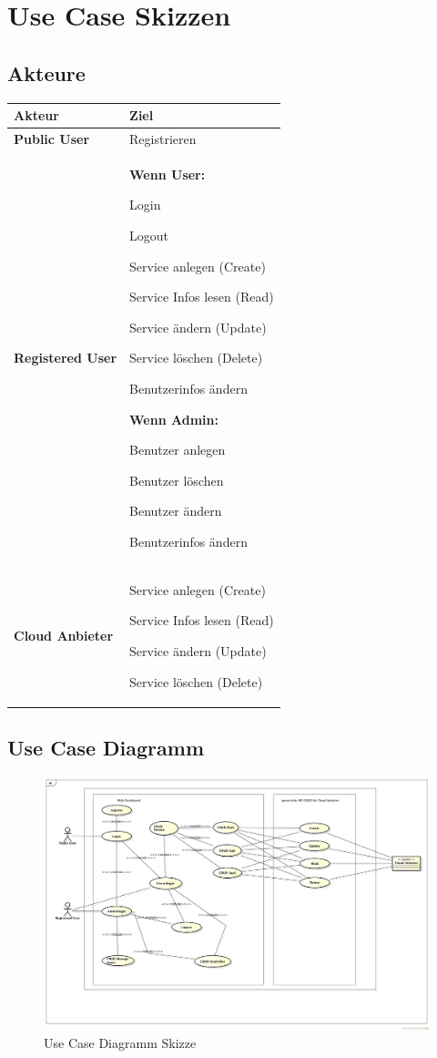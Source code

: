 \newpage
\section{Use Case Skizzen}
\subsection{Akteure}
\begin{tabularx}{\linewidth}{X X}
\textbf{Akteur} & \textbf{Ziel}\\
\hline
\textbf{Public User} &
Registrieren
\\
\hline
\textbf{Registered User} & 
\textbf{Wenn User:}

Login

Logout

Service anlegen (Create)

Service Infos lesen (Read)

Service ändern (Update)

Service löschen (Delete)

Benutzerinfos ändern

\textbf{Wenn Admin:}

Benutzer anlegen

Benutzer löschen

Benutzer ändern

Benutzerinfos ändern

\\
\hline
\textbf{Cloud Anbieter} &
Service anlegen (Create)

Service Infos lesen (Read)

Service ändern (Update)

Service löschen (Delete)
\\

\end{tabularx}


\subsection{Use Case Diagramm}
\begin{figure}[!htbp]
\includegraphics[width=\textwidth]{./03_Analyse/04_UseCases/images/UseCase-Skizzen}
\caption{Use Case Diagramm Skizze}
\end{figure}
